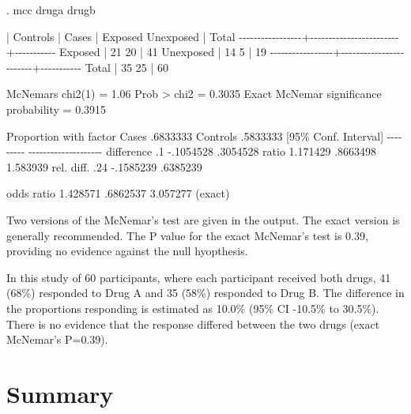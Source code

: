 \documentclass[
]{memoir}
\newenvironment{Shaded}{\begin{snugshade}}{\end{snugshade}}
\newcommand{\NormalTok}[1]{#1}
\begin{document}
\begin{Shaded}
\begin{Highlighting}[]
\NormalTok{. mcc druga drugb}

\NormalTok{                 |        Controls        |}
\NormalTok{Cases            |   Exposed   Unexposed  |      Total}
\NormalTok{{-}{-}{-}{-}{-}{-}{-}{-}{-}{-}{-}{-}{-}{-}{-}{-}{-}+{-}{-}{-}{-}{-}{-}{-}{-}{-}{-}{-}{-}{-}{-}{-}{-}{-}{-}{-}{-}{-}{-}{-}{-}+{-}{-}{-}{-}{-}{-}{-}{-}{-}{-}{-}}
\NormalTok{         Exposed |        21          20  |         41}
\NormalTok{       Unexposed |        14           5  |         19}
\NormalTok{{-}{-}{-}{-}{-}{-}{-}{-}{-}{-}{-}{-}{-}{-}{-}{-}{-}+{-}{-}{-}{-}{-}{-}{-}{-}{-}{-}{-}{-}{-}{-}{-}{-}{-}{-}{-}{-}{-}{-}{-}{-}+{-}{-}{-}{-}{-}{-}{-}{-}{-}{-}{-}}
\NormalTok{           Total |        35          25  |         60}

\NormalTok{McNemar\textquotesingle{}s chi2(1) =      1.06    Prob \textgreater{} chi2 = 0.3035}
\NormalTok{Exact McNemar significance probability       = 0.3915}

\NormalTok{Proportion with factor}
\NormalTok{        Cases       .6833333}
\NormalTok{        Controls    .5833333     [95\% Conf. Interval]}
\NormalTok{                   {-}{-}{-}{-}{-}{-}{-}{-}{-}     {-}{-}{-}{-}{-}{-}{-}{-}{-}{-}{-}{-}{-}{-}{-}{-}{-}{-}{-}{-}}
\NormalTok{        difference        .1     {-}.1054528   .3054528}
\NormalTok{        ratio       1.171429      .8663498   1.583939}
\NormalTok{        rel. diff.       .24     {-}.1585239   .6385239}

\NormalTok{        odds ratio  1.428571      .6862537   3.057277   (exact)}
\end{Highlighting}
\end{Shaded}

Two versions of the McNemar's test are given in the output. The exact version is generally recommended. The P value for the exact McNemar's test is 0.39, providing no evidence against the null hyopthesis.

In this study of 60 participants, where each participant received both drugs, 41 (68\%) responded to Drug A and 35 (58\%) responded to Drug B. The difference in the proportions responding is estimated as 10.0\% (95\% CI -10.5\% to 30.5\%). There is no evidence that the response differed between the two drugs (exact McNemar's P=0.39).

\hypertarget{summary}{%
\section{Summary}\label{summary}}
\end{document}
